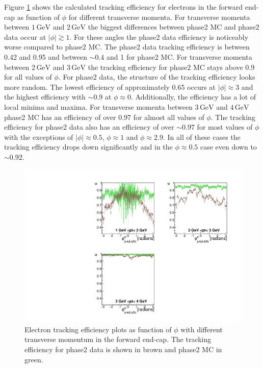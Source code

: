 \documentclass[a4paper,11pt,twosided,final,german,openbib,pdftex,listof=totoc,bibliography=totoc]{scrbook}
\begin{document}
Figure \ref{plt:xPtMPhiemFC} shows the calculated tracking efficiency for electrons in the forward end-cap as function of $\phi$ for different transverse momenta. 
For transverse momenta between $1\,\textrm{GeV}$ and $2\,\textrm{GeV}$ the biggest differences between phase2 MC and phase2 data occur at $|\phi| \gtrsim 1$. For these angles the phase2 data efficiency is noticeably worse compared to phase2 MC. The phase2 data tracking efficiency is between 0.42 and 0.95 and between $\sim 0.4$ and 1 for phase2 MC. 
For transverse momenta between $2\,\textrm{GeV}$ and $3\,\textrm{GeV}$ the tracking efficiency for phase2 MC stays above 0.9 for all values of $\phi$. For phase2 data, the structure of the tracking efficiency looks more random. The lowest efficiency of approximately 0.65 occurs at $|\phi| \approx 3$ and the highest efficiency with $\sim 0.9$ at $\phi \approx 0$. Additionally, the efficiency has a lot of local minima and maxima. 
For transverse momenta between $3\,\textrm{GeV}$ and $4\,\textrm{GeV}$ phase2 MC has an efficiency of over 0.97 for almost all values of $\phi$. The tracking efficiency for phase2 data also has an efficiency of over $\sim 0.97$ for most values of $\phi$ with the exceptions of $|\phi| \approx 0.5$, $\phi  \approx 1$ and $\phi \approx 2.9$. In all of these cases the tracking efficiency drops down significantly and in the $\phi \approx 0.5$ case even down to $\sim 0.92$.

\begin{figure}[!htbp]
	\centering
	\includegraphics[width=\textwidth]{Plots/master/xPtMPhiemFC}
	\caption[Transverse Momentum $\phi$ Electron Forward End-Cap Efficiency Phase2]{Electron tracking efficiency plots as function of $\phi$ with different transverse momentum in the forward end-cap. The tracking efficiency for phase2 data is shown in brown and phase2 MC in green.
		\label{plt:xPtMPhiemFC}}
\end{figure}
\end{document}
